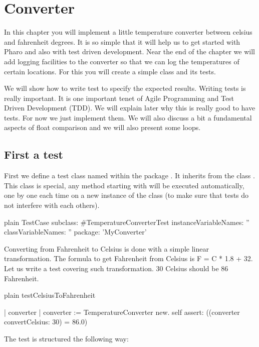 \documentclass[10pt,twoside,english]{_support/latex/sbabook/sbabook}
\begin{document}
\chapter{Converter}\label{cha_converter}
In this chapter you will implement a little temperature converter between celsius and fahrenheit degrees. It is so simple that it will help us to get started with Pharo and also with test driven development. Near the end of the chapter we will add logging facilities to the converter so that we can log the temperatures of certain locations.  For this you will create a simple class and its tests. 

We will show how to write test to specify the expected results. Writing tests is really important. It is one important tenet of Agile Programming and Test Driven Development (TDD). We will explain later why this is really good to have tests. For now we just implement them. We will also discuss a bit a fundamental aspects of float comparison and we will also present some loops.
\section{First a test}
First we define a test class named  within the package . It inherits from the class . This class is special, any method starting with  will be executed automatically, one by one each time on a new instance of the class (to make sure that tests do not interfere with each others). 

\begin{displaycode}{plain}
TestCase subclass: #TemperatureConverterTest
	instanceVariableNames: ''
	classVariableNames: ''
	package: 'MyConverter'
\end{displaycode}

Converting from Fahrenheit to Celsius is done with a simple linear transformation.
The formula to get Fahrenheit from Celsius is F = C * 1.8 + 32. 
Let us write a test covering such transformation. 30 Celsius should be 86 Fahrenheit. 

\begin{displaycode}{plain}
testCelsiusToFahrenheit

	| converter |
	converter := TemperatureConverter new. 
	self assert: ((converter convertCelsius: 30) = 86.0)
\end{displaycode}

The test is structured the following way:
\end{document}
